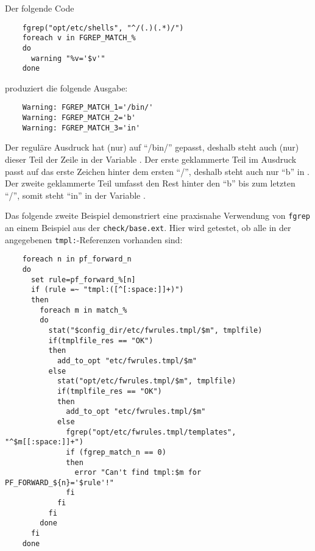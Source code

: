     Der folgende Code

\begin{example}
\begin{verbatim}
    fgrep("opt/etc/shells", "^/(.)(.*)/")
    foreach v in FGREP_MATCH_%
    do
      warning "%v='$v'"
    done
\end{verbatim}
\end{example}

    produziert die folgende Ausgabe:

\begin{example}
\begin{verbatim}
    Warning: FGREP_MATCH_1='/bin/'
    Warning: FGREP_MATCH_2='b'
    Warning: FGREP_MATCH_3='in'
\end{verbatim}
\end{example}

    Der reguläre Ausdruck hat (nur) auf "`/bin/"' gepasst, deshalb steht auch
    (nur) dieser Teil der Zeile in der Variable . Der erste
    geklammerte Teil im Ausdruck passt auf das erste Zeichen hinter dem ersten
    "`/"', deshalb steht auch nur "`b"' in . Der zweite
    geklammerte Teil umfasst den Rest hinter den "`b"' bis zum letzten "`/"',
    somit steht "`in"' in der Variable .

    Das folgende zweite Beispiel demonstriert eine praxisnahe Verwendung von
    \texttt{fgrep} an einem Beispiel aus der \texttt{check/base.ext}. Hier
    wird getestet, ob alle in der  angegebenen
    \texttt{tmpl:}-Referenzen vorhanden sind:

\begin{example}
\begin{verbatim}
    foreach n in pf_forward_n
    do
      set rule=pf_forward_%[n]
      if (rule =~ "tmpl:([^[:space:]]+)")
      then
        foreach m in match_%
        do
          stat("$config_dir/etc/fwrules.tmpl/$m", tmplfile)
          if(tmplfile_res == "OK")
          then
            add_to_opt "etc/fwrules.tmpl/$m"
          else
            stat("opt/etc/fwrules.tmpl/$m", tmplfile)
            if(tmplfile_res == "OK")
            then
              add_to_opt "etc/fwrules.tmpl/$m"
            else
              fgrep("opt/etc/fwrules.tmpl/templates", "^$m[[:space:]]+")
              if (fgrep_match_n == 0)
              then
                error "Can't find tmpl:$m for PF_FORWARD_${n}='$rule'!"
              fi
            fi
          fi
        done
      fi
    done
\end{verbatim}
\end{example}

